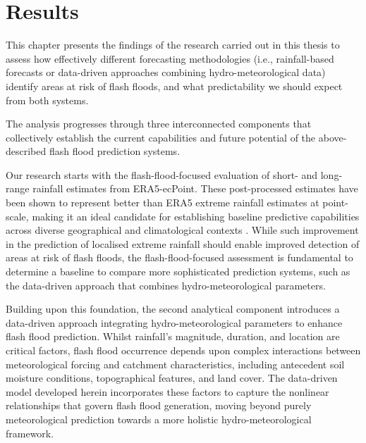 \chapter{Results}
\label{results}
\graphicspath{{chapter_05/figures}{chapter_05/tables}}

This chapter presents the findings of the research carried out in this thesis to assess how effectively different forecasting methodologies (i.e., rainfall-based forecasts or data-driven approaches combining hydro-meteorological data) identify areas at risk of flash floods, and what predictability we should expect from both systems.

The analysis progresses through three interconnected components that collectively establish the current capabilities and future potential of the above-described flash flood prediction systems. 

Our research starts with the flash-flood-focused evaluation of short- and long-range rainfall estimates from ERA5-ecPoint. These post-processed estimates have been shown to represent better than ERA5 extreme rainfall estimates at point-scale, making it an ideal candidate for establishing baseline predictive capabilities across diverse geographical and climatological contexts \citep{Pillosu_2025a}. While such improvement in the prediction of localised extreme rainfall should enable improved detection of areas at risk of flash floods, the flash-flood-focused assessment is fundamental to determine a baseline to compare more sophisticated prediction systems, such as the data-driven approach that combines hydro-meteorological parameters.

Building upon this foundation, the second analytical component introduces a data-driven approach integrating hydro-meteorological parameters to enhance flash flood prediction. Whilst rainfall's magnitude, duration, and location are critical factors, flash flood occurrence depends upon complex interactions between meteorological forcing and catchment characteristics, including antecedent soil moisture conditions, topographical features, and land cover. The data-driven model developed herein incorporates these factors to capture the nonlinear relationships that govern flash flood generation, moving beyond purely meteorological prediction towards a more holistic hydro-meteorological framework.


